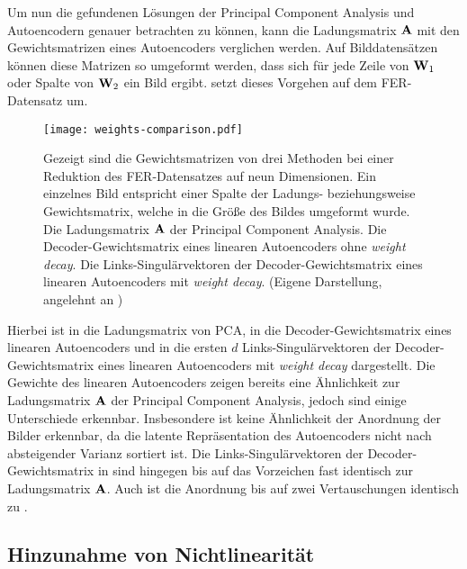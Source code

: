 Um nun die gefundenen Lösungen der Principal Component Analysis und Autoencodern genauer betrachten
zu können, kann die Ladungsmatrix $\mathbf{A}$ mit den Gewichtsmatrizen eines Autoencoders verglichen
werden. Auf Bilddatensätzen können diese Matrizen so umgeformt werden, dass sich für jede Zeile von
$\mathbf{W}_1$ oder Spalte von $\mathbf{W}_2$ ein Bild ergibt.  setzt
dieses Vorgehen auf dem FER-Datensatz um.
\begin{figure}[ht]
	\centering
	\texttt{[image: weights-comparison.pdf]}
	\caption[Die Gewichtsmatrizen von drei Methoden auf dem FER-Datensatz]{Gezeigt sind die Gewichtsmatrizen von drei Methoden bei einer Reduktion des FER-Datensatzes auf neun Dimensionen. Ein einzelnes Bild entspricht einer Spalte der Ladungs- beziehungsweise Gewichtsmatrix, welche in die Größe des Bildes umgeformt wurde. \captiona Die Ladungsmatrix $\mathbf{A}$ der Principal Component Analysis. \captionb Die Decoder-Gewichtsmatrix eines linearen Autoencoders ohne \textit{weight decay}. \captionc Die Links-Singulärvektoren der Decoder-Gewichtsmatrix eines linearen Autoencoders \captionb mit \textit{weight decay}. (Eigene Darstellung, angelehnt an \textcite[5]{Plaut.2018})}
	\label{fig:Gewichtsvergleich}
\end{figure}
Hierbei ist in  \captiona die Ladungsmatrix von PCA, in \captionb die Decoder-Gewichtsmatrix eines linearen Autoencoders und in \captionc die ersten $d$ Links-Singulärvektoren der Decoder-Gewichtsmatrix eines linearen Autoencoders mit \textit{weight decay} dargestellt.
Die Gewichte des linearen Autoencoders zeigen bereits eine Ähnlichkeit zur Ladungsmatrix $\mathbf{A}$ der Principal Component Analysis, jedoch sind einige Unterschiede erkennbar. Insbesondere ist keine Ähnlichkeit der Anordnung der Bilder erkennbar, da die latente Repräsentation des Autoencoders nicht nach absteigender Varianz sortiert ist. Die Links-Singulärvektoren der Decoder-Gewichtsmatrix in \captionc sind hingegen bis auf das Vorzeichen fast identisch zur Ladungsmatrix $\mathbf{A}$. Auch ist die Anordnung bis auf zwei Vertauschungen identisch zu \captiona.

\subsection{Hinzunahme von Nichtlinearität}

